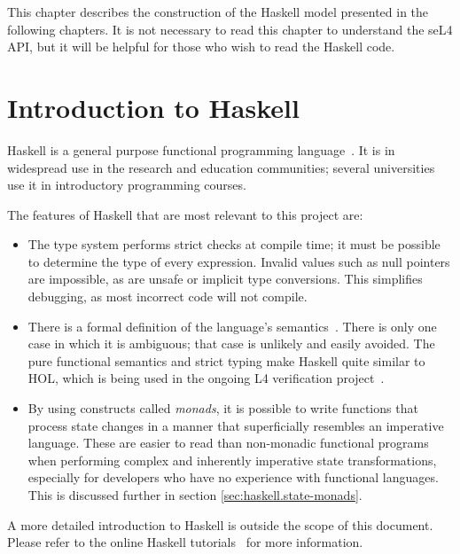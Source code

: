 %
%
%
%

This chapter describes the construction of the Haskell model presented in the following chapters. It is not necessary to read this chapter to understand the seL4 API, but it will be helpful for those who wish to read the Haskell code.

\section{Introduction to Haskell}\label{sec:haskell.intro}

Haskell is a general purpose functional programming language~\cite{peytonjones03haskell}. It is in widespread use in the research and education communities; several universities use it in introductory programming courses.

The features of Haskell that are most relevant to this project are:
\begin{itemize}
\item The type system performs strict checks at compile time; it must be possible to determine the type of every expression. Invalid values such as null pointers are impossible, as are unsafe or implicit type conversions. This simplifies debugging, as most incorrect code will not compile.
\item There is a formal definition of the language's semantics~\cite{Fax:static}. There is only one case in which it is ambiguous; that case is unlikely and easily avoided. The pure functional semantics and strict typing make Haskell quite similar to HOL, which is being used in the ongoing L4 verification project~\cite{Tuch-KH-05}.
\item By using constructs called \emph{monads}, it is possible to write functions that process state changes in a manner that superficially resembles an imperative language. These are easier to read than non-monadic functional programs when performing complex and inherently imperative state transformations, especially for developers who have no experience with functional languages. This is discussed further in section \ref{sec:haskell.state-monads}.
\end{itemize}

A more detailed introduction to Haskell is outside the scope of this document. Please refer to the online Haskell tutorials~\cite{haskell-tutorial,monad-tutorial} for more information.

